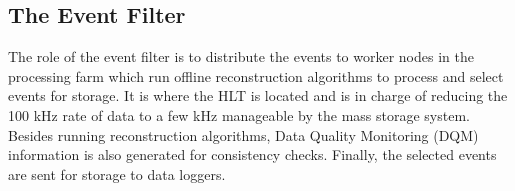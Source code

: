     \subsection{The Event Filter}

      The role of the event filter is to distribute the events to worker nodes in the processing farm which run offline reconstruction algorithms to process and select events for storage. It is where the HLT is located and is in charge of reducing the 100 kHz rate of data to a few kHz manageable by the mass storage system. Besides running reconstruction algorithms, Data Quality Monitoring (DQM) information is also generated for consistency checks. Finally, the selected events are sent for storage to data loggers.

